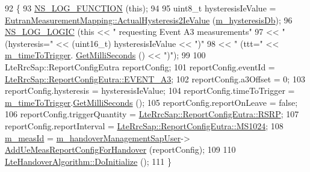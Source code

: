 \begin{DoxyCode}
92 \{
93   \hyperlink{log-macros-disabled_8h_a90b90d5bad1f39cb1b64923ea94c0761}{NS\_LOG\_FUNCTION} (\textcolor{keyword}{this});
94 
95   uint8\_t hysteresisIeValue = \hyperlink{classns3_1_1EutranMeasurementMapping_a38be54b75b2d4e08fd212310cb668881}{EutranMeasurementMapping::ActualHysteresis2IeValue}
       (\hyperlink{classns3_1_1A3RsrpHandoverAlgorithm_a2554a9c093c29f93f40efd6778d12a75}{m\_hysteresisDb});
96   \hyperlink{group__logging_ga88acd260151caf2db9c0fc84997f45ce}{NS\_LOG\_LOGIC} (\textcolor{keyword}{this} << \textcolor{stringliteral}{" requesting Event A3 measurements"}
97                      << \textcolor{stringliteral}{" (hysteresis="} << (uint16\_t) hysteresisIeValue << \textcolor{stringliteral}{")"}
98                      << \textcolor{stringliteral}{" (ttt="} << \hyperlink{classns3_1_1A3RsrpHandoverAlgorithm_a5158741f07ce566b8efc01f5e798ae78}{m\_timeToTrigger}.
      \hyperlink{classns3_1_1Time_aba3428a8b6c4c8d9014ce44145081f34}{GetMilliSeconds} () << \textcolor{stringliteral}{")"});
99 
100   LteRrcSap::ReportConfigEutra reportConfig;
101   reportConfig.eventId = \hyperlink{structns3_1_1LteRrcSap_1_1ReportConfigEutra_ab8152dc095987f60bee2e9115046902fa2899a3564e1c06edb586b1768ccf3acd}{LteRrcSap::ReportConfigEutra::EVENT\_A3};
102   reportConfig.a3Offset = 0;
103   reportConfig.hysteresis = hysteresisIeValue;
104   reportConfig.timeToTrigger = \hyperlink{classns3_1_1A3RsrpHandoverAlgorithm_a5158741f07ce566b8efc01f5e798ae78}{m\_timeToTrigger}.\hyperlink{classns3_1_1Time_aba3428a8b6c4c8d9014ce44145081f34}{GetMilliSeconds} ();
105   reportConfig.reportOnLeave = \textcolor{keyword}{false};
106   reportConfig.triggerQuantity = \hyperlink{structns3_1_1LteRrcSap_1_1ReportConfigEutra_a82343ddf526faba0483431ea5882a3efa5b7591e86ab7bcefc7fe1528762114d7}{LteRrcSap::ReportConfigEutra::RSRP};
107   reportConfig.reportInterval = \hyperlink{structns3_1_1LteRrcSap_1_1ReportConfigEutra_aa04b2781a844eb212d59762829e41d31abf2b9417aacdfb7aecfaccca7a69969d}{LteRrcSap::ReportConfigEutra::MS1024};
108   \hyperlink{classns3_1_1A3RsrpHandoverAlgorithm_a96ba4646b316fc823618934a7a6d4aa1}{m\_measId} = \hyperlink{classns3_1_1A3RsrpHandoverAlgorithm_a2b06a54ee8a69e6943a4bd79bfe8da58}{m\_handoverManagementSapUser}->
      \hyperlink{classns3_1_1LteHandoverManagementSapUser_a80f34ec0e586b42547210c1741b4f980}{AddUeMeasReportConfigForHandover} (reportConfig);
109 
110   \hyperlink{classns3_1_1Object_af8482a521433409fb5c7f749398c9dbe}{LteHandoverAlgorithm::DoInitialize} ();
111 \}
\end{DoxyCode}


